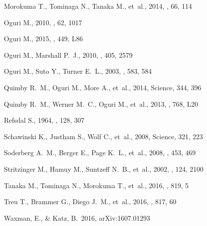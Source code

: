 \documentclass[useAMS,usenatbib,twocolumn]{mnras}
\begin{document}
\begin{thebibliography}{26}
{Morokuma} T., {Tominaga} N., {Tanaka} M., et~al., 2014, \pasj, 66, 114

{Oguri} M., 2010, \pasj, 62, 1017

{Oguri} M., 2015, \mnras, 449, L86

{Oguri} M., {Marshall} P.~J., 2010, \mnras, 405, 2579

{Oguri} M., {Suto} Y., {Turner} E.~L., 2003, \apj, 583, 584

{Quimby} R.~M., {Oguri} M., {More} A., et~al., 2014, Science, 344, 396

{Quimby} R.~M., {Werner} M.~C., {Oguri} M., et~al., 2013, \apjl, 768, L20

{Refsdal} S., 1964, \mnras, 128, 307

{Schawinski} K., {Justham} S., {Wolf} C., et~al., 2008, Science, 321, 223

{Soderberg} A.~M., {Berger} E., {Page} K.~L., et~al., 2008, \nat, 453, 469

{Stritzinger} M., {Hamuy} M., {Suntzeff} N.~B., et~al., 2002, \aj, 124, 2100

{Tanaka} M., {Tominaga} N., {Morokuma} T., et~al., 2016, \apj, 819, 5

{Treu} T., {Brammer} G., {Diego} J.~M., et~al., 2016, \apj, 817, 60

 Waxman, E., \& Katz, B.\ 2016, arXiv:1607.01293 


\end{thebibliography}

          
\end{document}
